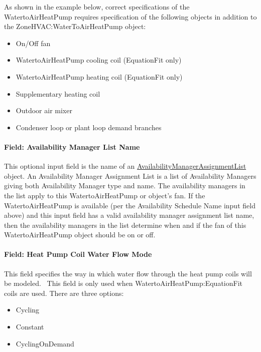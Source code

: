 As shown in the example below, correct specifications of the WatertoAirHeatPump requires specification of the following objects in addition to the ZoneHVAC:WaterToAirHeatPump object:

\begin{itemize}
\item
  On/Off fan
\item
  WatertoAirHeatPump cooling coil (EquationFit only)
\item
  WatertoAirHeatPump heating coil (EquationFit only)
\item
  Supplementary heating coil
\item
  Outdoor air mixer
\item
  Condenser loop or plant loop demand branches
\end{itemize}

\paragraph{Field: Availability Manager List Name}\label{field-availability-manager-list-name-8}

This optional input field is the name of an \hyperref[availabilitymanagerassignmentlist]{AvailabilityManagerAssignmentList} object. An Availability Manager Assignment List is a list of Availability Managers giving both Availability Manager type and name. The availability managers in the list apply to this WatertoAirHeatPump or object's fan. If the WatertoAirHeatPump is available (per the Availability Schedule Name input field above) and this input field has a valid availability manager assignment list name, then the availability managers in the list determine when and if the fan of this WatertoAirHeatPump object should be on or off.

\paragraph{Field: Heat Pump Coil Water Flow Mode}\label{field-heat-pump-coil-water-flow-mode-001}

This field specifies the way in which water flow through the heat pump coils will be modeled.~ This field is only used when WatertoAirHeatPump:EquationFit coils are used. There are three options:

\begin{itemize}
\item
  Cycling
\item
  Constant
\item
  CyclingOnDemand
\end{itemize}

